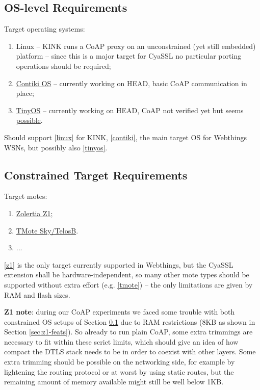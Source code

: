 \documentclass[10pt]{article}
\begin{document}
\subsection{OS-level Requirements}
\label{sec:reqs-os}
Target operating systems:
\begin{enumerate}
\item\label{linux} Linux -- KINK runs a CoAP proxy on an unconstrained (yet still embedded) platform -- since this is a major target for CyaSSL no particular porting operations should be required;
\item\label{contiki} \href{http://www.contiki-os.org}{Contiki OS} -- currently working on HEAD, basic CoAP communication in place;
\item\label{tinyos} \href{http://www.tinyos.net}{TinyOS} -- currently working on HEAD, CoAP not verified yet but seems \href{http://zolertia.sourceforge.net/wiki/index.php/Blip_v2.0}{possible}.
\end{enumerate}

Should support \ref{linux} for KINK, \ref{contiki}, the main target OS for Webthings WSNs, but possibly also \ref{tinyos}.

\subsection{Constrained Target Requirements}
Target motes:
\begin{enumerate}
\item\label{z1} \href{http://www.zolertia.com/ti}{Zolertia Z1};
\item\label{tmote} \href{http://www.ti.com/tool/msp430-3p-motei-tmotesky-dsgkt}{TMote Sky/TelosB}.
\item ...
\end{enumerate}

\ref{z1} is the only target currently supported in Webthings, but the CyaSSL extension shall be hardware-independent, so many other mote types should be supported without extra effort (e.g. \ref{tmote}) -- the only limitations are given by RAM and flash sizes.

\textbf{Z1 note}: during our CoAP experiments we faced some trouble with both constrained OS setups of Section \ref{sec:reqs-os} due to RAM restrictions (8KB as shown in Section \ref{sec:z1-feats}). So already to run plain CoAP, some extra trimmings are necessary to fit within these scrict limits, which should give an idea of how compact the DTLS stack needs to be in order to coexist with other layers. Some extra trimming should be possible on the networking side, for example by lightening the routing protocol or at worst by using static routes, but the remaining amount of memory available might still be well below 1KB.
\end{document}
